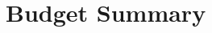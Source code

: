 \chapter*{Budget Summary}
{}
{}
\label{sec:summary-budget}
\thispagestyle{fancy}

\vspace{1in}

\begin{center}

\end{center}

\vfill
